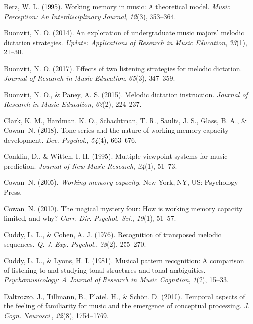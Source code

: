 \documentclass[english,man]{apa6}
\begin{document}
\leavevmode\hypertarget{ref-Berz1995-lu}{}%
Berz, W. L. (1995). Working memory in music: A theoretical model. \emph{Music Perception: An Interdisciplinary Journal}, \emph{12}(3), 353--364.

\leavevmode\hypertarget{ref-Buonviri2014-ch}{}%
Buonviri, N. O. (2014). An exploration of undergraduate music majors' melodic dictation strategies. \emph{Update: Applications of Research in Music Education}, \emph{33}(1), 21--30.

\leavevmode\hypertarget{ref-Buonviri2017-gp}{}%
Buonviri, N. O. (2017). Effects of two listening strategies for melodic dictation. \emph{Journal of Research in Music Education}, \emph{65}(3), 347--359.

\leavevmode\hypertarget{ref-Buonviri2015-qe}{}%
Buonviri, N. O., \& Paney, A. S. (2015). Melodic dictation instruction. \emph{Journal of Research in Music Education}, \emph{62}(2), 224--237.

\leavevmode\hypertarget{ref-Clark2018-mr}{}%
Clark, K. M., Hardman, K. O., Schachtman, T. R., Saults, J. S., Glass, B. A., \& Cowan, N. (2018). Tone series and the nature of working memory capacity development. \emph{Dev. Psychol.}, \emph{54}(4), 663--676.

\leavevmode\hypertarget{ref-Conklin1995-qk}{}%
Conklin, D., \& Witten, I. H. (1995). Multiple viewpoint systems for music prediction. \emph{Journal of New Music Research}, \emph{24}(1), 51--73.

\leavevmode\hypertarget{ref-Cowan2005-vx}{}%
Cowan, N. (2005). \emph{Working memory capacity}. New York, NY, US: Psychology Press.

\leavevmode\hypertarget{ref-Cowan2010-zc}{}%
Cowan, N. (2010). The magical mystery four: How is working memory capacity limited, and why? \emph{Curr. Dir. Psychol. Sci.}, \emph{19}(1), 51--57.

\leavevmode\hypertarget{ref-Cuddy1976-dk}{}%
Cuddy, L. L., \& Cohen, A. J. (1976). Recognition of transposed melodic sequences. \emph{Q. J. Exp. Psychol.}, \emph{28}(2), 255--270.

\leavevmode\hypertarget{ref-Cuddy1981-ha}{}%
Cuddy, L. L., \& Lyons, H. I. (1981). Musical pattern recognition: A comparison of listening to and studying tonal structures and tonal ambiguities. \emph{Psychomusicology: A Journal of Research in Music Cognition}, \emph{1}(2), 15--33.

\leavevmode\hypertarget{ref-Daltrozzo2010-yn}{}%
Daltrozzo, J., Tillmann, B., Platel, H., \& Schön, D. (2010). Temporal aspects of the feeling of familiarity for music and the emergence of conceptual processing. \emph{J. Cogn. Neurosci.}, \emph{22}(8), 1754--1769.
\end{document}
